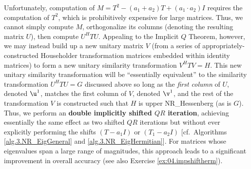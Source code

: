 Unfortunately, computation of $M=T^2 - (a_1+a_2) T + (a_1\cdot a_2) I$ requires the computation of $T^2$, which is prohibitively expensive for large matrices.  Thus, we cannot simply
compute $M$, orthogonalize its columns (denoting the resulting matrix $U$), then compute $U^H T U$.  Appealing to the Implicit $Q$ Theorem, however, we may instead build up a new unitary
matrix $V$ (from a series of appropriately-constructed Householder transformation matrices embedded within identity matrices) to form a new unitary similarity transformation $V^H T V=H$.
This new unitary similarity transformation will be ``essentially equivalent'' to the similarity transformation $U^H T U =G$ discussed above so long as the {\it first column} of $U$, denoted $\u^1$, matches the first column of $V$, denoted $\v^1$,
and the rest of the transformation $V$ is constructed such that $H$ is upper NR_Hessenberg (as is $G$).  Thus, we perform an {\bf double implicitly shifted $QR$ iteration},
achieving essentially the same effect as two shifted $QR$ iterations but without ever explicitly performing the shifts $(T-a_1 I)$ or $(T_1-a_2 I)$ [cf.~Algorithms \ref{alg.3.NR_EigGeneral} and
\ref{alg.3.NR_EigHermitian}].  For matrices whose eigenvalues span a large range of magnitudes, this approach leads to a significant improvement in overall accuracy (see also Exercise
\ref{ex:04.impshiftherm}).

